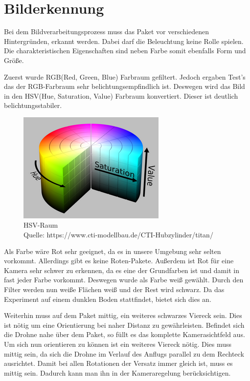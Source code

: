 \chapter{Bilderkennung}
\label{bilderkennung}
Bei dem Bildverarbeitungsprozess muss das Paket vor verschiedenen Hintergründen, erkannt werden. Dabei darf die Beleuchtung keine Rolle spielen. Die charakteristischen Eigenschaften sind neben Farbe somit ebenfalls Form und Größe.

Zuerst wurde RGB(Red, Green, Blue) Farbraum gefiltert. Jedoch ergaben Test's das der RGB-Farbraum sehr belichtungsempfindlich ist. Deswegen wird das Bild in den HSV(Hue, Saturation, Value) Farbraum konvertiert. Dieser ist deutlich belichtungsstabiler.
\begin{figure}[h]
	\centering
	\includegraphics[scale=0.5]{"Grafiken/hsv_colorspace_zoom34.png"}
	\caption{HSV-Raum \\Quelle: https://www.cti-modellbau.de/CTI-Hubzylinder/titan/}
	\label{fig:meine-grafik}
\end{figure}
Als Farbe wäre Rot sehr geeignet, da es in unsere Umgebung sehr selten vorkommt. Allerdings gibt es keine Roten-Pakete. Außerdem ist Rot für eine Kamera sehr schwer zu erkennen, da es eine der Grundfarben ist und damit in fast jeder Farbe vorkommt. Deswegen wurde als Farbe weiß gewählt. Durch den Filter werden nun weiße Flächen weiß und der Rest wird schwarz. Da das Experiment auf einem dunklen Boden stattfindet, bietet sich dies an.

Weiterhin muss auf dem Paket mittig, ein weiteres schwarzes Viereck sein. Dies ist nötig um eine Orientierung bei naher Distanz zu gewährleisten. Befindet sich die Drohne nahe über dem Paket, so füllt es das komplette Kamerasichtfeld aus. Um sich nun orientieren zu können ist ein weiteres Viereck nötig. Dies muss mittig sein, da sich die Drohne im Verlauf des Anflugs parallel zu dem Rechteck ausrichtet. Damit bei allen Rotationen der Versatz immer gleich ist, muss es mittig sein. Dadurch kann man ihn in der Kameraregelung berücksichtigen.

